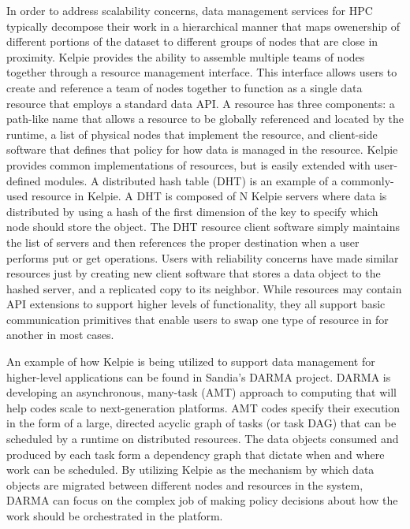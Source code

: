 In order to address scalability concerns, data management services for HPC
typically decompose their work in a hierarchical manner that maps owenership of
different portions of the dataset to different groups of nodes that are close
in proximity. Kelpie provides the ability to assemble multiple teams of nodes
together through a resource management interface. This interface allows users
to create and reference a team of nodes together to function as a single data
resource that employs a standard data API. A resource has three components: a
path-like name that allows a resource to be globally referenced and located by
the runtime, a list of physical nodes that implement the resource, and
client-side software that defines that policy for how data is managed in the
resource. Kelpie provides common implementations of resources, but is easily
extended with user-defined modules. A distributed hash table (DHT) is an
example of a commonly-used resource in Kelpie. A DHT is composed of N Kelpie
servers where data is distributed by using a hash of the first dimension of the
key to specify which node should store the object. The DHT resource client
software simply maintains the list of servers and then references the proper
destination when a user performs put or get operations. Users with reliability
concerns have made similar resources just by creating new client software that
stores a data object to the hashed server, and a replicated copy to its
neighbor. While resources may contain API extensions to support higher levels
of functionality, they all support basic communication primitives that enable
users to swap one type of resource in for another in most cases.

An example of how Kelpie is being utilized to support data management for
higher-level applications can be found in Sandia's DARMA project. DARMA is
developing an asynchronous, many-task (AMT) approach to computing that will
help codes scale to next-generation platforms. AMT codes specify their
execution in the form of a large, directed acyclic graph of tasks (or task DAG)
that can be scheduled by a runtime on distributed resources. The data objects
consumed and produced by each task form a dependency graph that dictate when
and where work can be scheduled. By utilizing Kelpie as the mechanism by which
data objects are migrated between different nodes and resources in the system,
DARMA can focus on the complex job of making policy decisions about how the
work should be orchestrated in the platform.

